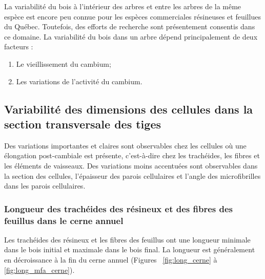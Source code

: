 La variabilité du bois à l'intérieur des arbres et entre les arbres de la même espèce est encore peu connue pour les espèces commerciales résineuses et feuillues du Québec. Toutefois, des efforts de recherche sont présentement consentis dans ce domaine. La variabilité du bois dans un arbre dépend principalement de deux facteurs :

\begin{enumerate}
\item Le vieillissement du cambium;
\item Les variations de l'activité du cambium.
\end{enumerate}

\subsection{Variabilité des dimensions des cellules dans la section transversale des tiges}

Des variations importantes et claires sont observables chez les cellules où une élongation post-cambiale est présente, c'est-à-dire chez les trachéides, les fibres et les éléments de vaisseaux. Des variations moins accentuées sont observables dans la section des cellules, l'épaisseur des parois cellulaires et l'angle des microfibrilles dans les parois cellulaires.

\subsubsection{Longueur des trachéides des résineux et des fibres des feuillus dans le cerne annuel}

Les trachéides des résineux et les fibres des feuillus ont une longueur minimale dans le bois initial et maximale dans le bois final. La longueur est généralement en décroissance à la fin du cerne annuel (Figures ~\ref{fig:long_cerne} à \ref{fig:long_mfa_cerne}).

